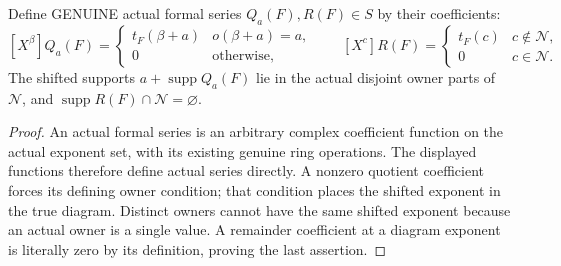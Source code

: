 \begin{theorem}
\label{hir:actual-formal-vertex-division-supports}
Define GENUINE actual formal series $Q_a(F),R(F)\in S$ by their coefficients:
\[
 [X^\beta]Q_a(F)=
 \begin{cases}t_F(\beta+a)&o(\beta+a)=a,\\0&\text{otherwise},\end{cases}
 \qquad
 [X^c]R(F)=
 \begin{cases}t_F(c)&c\notin\mathcal N,\\0&c\in\mathcal N.\end{cases}
\]
The shifted supports $a+\operatorname{supp}Q_a(F)$ lie in the actual
disjoint owner parts of $\mathcal N$, and
$\operatorname{supp}R(F)\cap\mathcal N=\varnothing$.
\leanok
\end{theorem}
\begin{proof}
An actual formal series is an arbitrary complex coefficient function on
the actual exponent set, with its existing genuine ring operations.
The displayed functions therefore define actual series directly.
A nonzero quotient coefficient forces its defining owner condition;
that condition places the shifted exponent in the true diagram. Distinct
owners cannot have the same shifted exponent because an actual owner
is a single value. A remainder coefficient at a diagram exponent is
literally zero by its definition, proving the last assertion.
\end{proof}

